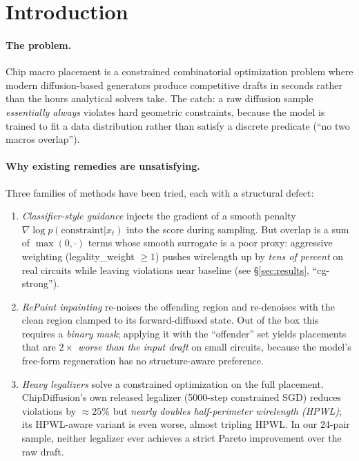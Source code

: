 \documentclass{article}
\begin{document}
\section{Introduction}

\paragraph{The problem.}  Chip macro placement is a constrained combinatorial
optimization problem where modern diffusion-based generators
\cite{chipdiffusion} produce competitive drafts in seconds rather than the
hours analytical solvers take.  The catch: a raw diffusion sample
\emph{essentially always} violates hard geometric constraints, because the
model is trained to fit a data distribution rather than satisfy a discrete
predicate (``no two macros overlap'').

\paragraph{Why existing remedies are unsatisfying.}  Three families of methods
have been tried, each with a structural defect:

\begin{enumerate}
\item \emph{Classifier-style guidance} \cite{classifier-guidance,
constraint-guidance} injects the gradient of a smooth
penalty $\nabla \log p(\mathrm{constraint}|x_t)$ into the score during sampling.
But overlap is a sum of $\max(0, \cdot)$ terms whose smooth surrogate is a poor
proxy: aggressive weighting (legality\_weight $\geq 1$) pushes wirelength up by
\emph{tens of percent} on real circuits while leaving violations near baseline
(see \S\ref{sec:results}, ``cg-strong'').
\item \emph{RePaint inpainting} \cite{repaint} re-noises the offending region
and re-denoises with the clean region clamped to its forward-diffused state.
Out of the box this requires a \emph{binary mask}; applying it with the
``offender'' set yields placements that are \emph{$2\times$ worse than the
input draft} on small circuits, because the model's free-form regeneration
has no structure-aware preference.
\item \emph{Heavy legalizers} \cite{ntuplace, dreamplace, chipdiffusion}
solve a constrained optimization on the full placement.  ChipDiffusion's own
released legalizer (5000-step constrained SGD) reduces violations by
$\approx 25\%$ but \emph{nearly doubles half-perimeter wirelength (HPWL)}; its
HPWL-aware variant is even worse, almost tripling HPWL.  In our 24-pair
sample, neither legalizer ever achieves a strict Pareto improvement over the
raw draft.
\end{enumerate}
\end{document}
